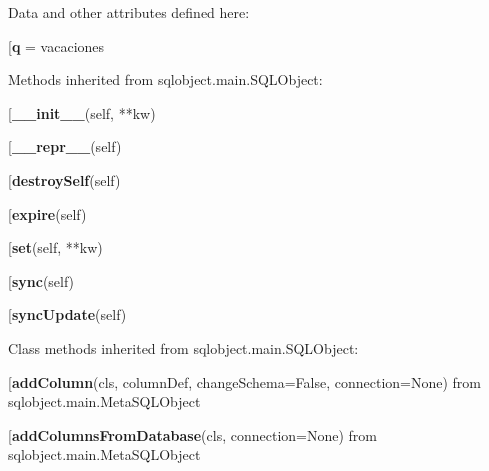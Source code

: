 Data and other attributes defined here:\\
\begin{description}\item[{\bf q} = vacaciones\end{description}


Methods inherited from sqlobject.main.SQLObject:\\
\begin{description}\item[{\bf \_\_init\_\_}(self, **kw)\end{description}

\begin{description}\item[{\bf \_\_repr\_\_}(self)\end{description}

\begin{description}\item[{\bf destroySelf}(self)\end{description}

\begin{description}\item[{\bf expire}(self)\end{description}

\begin{description}\item[{\bf set}(self, **kw)\end{description}

\begin{description}\item[{\bf sync}(self)\end{description}

\begin{description}\item[{\bf syncUpdate}(self)\end{description}


Class methods inherited from sqlobject.main.SQLObject:\\
\begin{description}\item[{\bf addColumn}(cls, columnDef, changeSchema=False, connection=None) from sqlobject.main.MetaSQLObject\end{description}

\begin{description}\item[{\bf addColumnsFromDatabase}(cls, connection=None) from sqlobject.main.MetaSQLObject\end{description}

